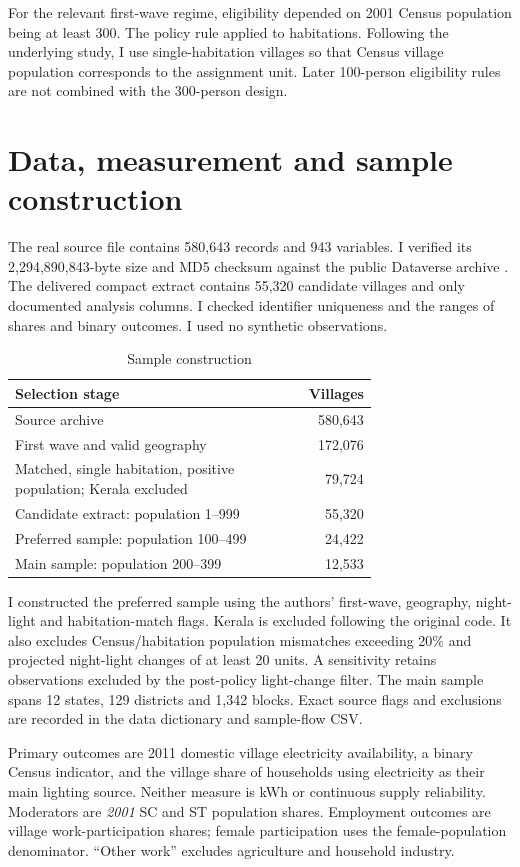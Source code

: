 \documentclass[11pt,a4paper]{article}
\begin{document}
For the relevant first-wave regime, eligibility depended on 2001 Census population being at least 300. The policy rule applied to habitations. Following the underlying study, I use single-habitation villages so that Census village population corresponds to the assignment unit. Later 100-person eligibility rules are not combined with the 300-person design.

\section{Data, measurement and sample construction}
The real source file contains 580,643 records and 943 variables. I verified its 2,294,890,843-byte size and MD5 checksum against the public Dataverse archive \cite{data}. The delivered compact extract contains 55,320 candidate villages and only documented analysis columns. I checked identifier uniqueness and the ranges of shares and binary outcomes. I used no synthetic observations.

\begin{table}[htbp]\centering
\caption{Sample construction}
\label{tab:sample}
\begin{tabular}{p{0.72\linewidth}r}\toprule
Selection stage & Villages \\ \midrule
Source archive & 580,643 \\
First wave and valid geography & 172,076 \\
Matched, single habitation, positive population; Kerala excluded & 79,724 \\
Candidate extract: population 1--999 & 55,320 \\
Preferred sample: population 100--499 & 24,422 \\
Main sample: population 200--399 & 12,533 \\
\bottomrule\end{tabular}
\end{table}

I constructed the preferred sample using the authors' first-wave, geography, night-light and habitation-match flags. Kerala is excluded following the original code. It also excludes Census/habitation population mismatches exceeding 20\% and projected night-light changes of at least 20 units. A sensitivity retains observations excluded by the post-policy light-change filter. The main sample spans 12 states, 129 districts and 1,342 blocks. Exact source flags and exclusions are recorded in the data dictionary and sample-flow CSV.

Primary outcomes are 2011 domestic village electricity availability, a binary Census indicator, and the village share of households using electricity as their main lighting source. Neither measure is kWh or continuous supply reliability. Moderators are \emph{2001} SC and ST population shares. Employment outcomes are village work-participation shares; female participation uses the female-population denominator. ``Other work'' excludes agriculture and household industry.
\end{document}

